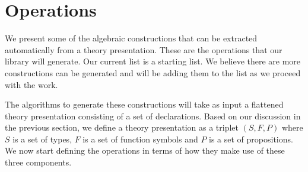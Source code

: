 
\section{Operations}
\label{sec:operations}
We present some of the algebraic constructions that can be extracted automatically from a theory 
presentation. These are the operations that our library will generate. Our current list is a starting 
list. We believe there are more constructions can be generated and will be adding them to the list 
as we proceed with the work. 

The algorithms to generate these constructions will take as input a flattened theory presentation 
consisting of a set of declarations. Based on our discussion in the previous section, we define a 
theory presentation as a triplet $(S,F,P)$ where $S$ is a set of types, $F$ is a set of function 
symbols and $P$ is a set of propositions.
We now start defining the operations in terms of how they make use of these three components. 
